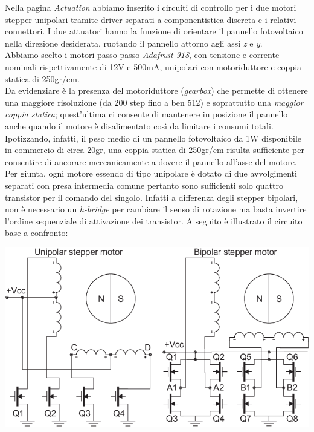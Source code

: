\noindent Nella pagina \emph{Actuation} abbiamo inserito i circuiti di controllo per 
i due motori stepper unipolari tramite driver separati a
componentistica discreta e i relativi connettori. I due attuatori hanno
la funzione di orientare il pannello fotovoltaico nella direzione
desiderata, ruotando il pannello attorno agli assi \emph{z} e \emph{y}.\\
Abbiamo scelto i motori passo-passo \emph{Adafruit 918}, con tensione e
corrente nominali rispettivamente di 12V e 500mA, unipolari con
motoriduttore e coppia statica di 250gr/cm.\\
Da evidenziare è la presenza del motoriduttore (\emph{gearbox}) che
permette di ottenere una maggiore risoluzione (da 200 step fino a ben
512) e soprattutto una \emph{maggior coppia statica}; quest'ultima ci
consente di mantenere in posizione il pannello anche quando il motore è
disalimentato così da limitare i consumi totali. Ipotizzando, infatti,
il peso medio di un pannello fotovoltaico da 1W disponibile in commercio
di circa 20gr, una coppia statica di 250gr/cm risulta sufficiente per
consentire di ancorare meccanicamente a dovere il pannello all'asse del
motore.\\
Per giunta, ogni motore essendo di tipo unipolare è dotato di due
avvolgimenti separati con presa intermedia comune pertanto sono
sufficienti solo quattro transistor per il comando del singolo. Infatti
a differenza degli stepper bipolari, non è necessario un \emph{h-bridge}
per cambiare il senso di rotazione ma basta invertire l'ordine
sequenziale di attivazione dei transistor. A seguito è illustrato il
circuito base a confronto:

\begin{center}
\includegraphics[scale=0.6]{figures/image75.png}
\captionsetup{type=figure}
\end{center}

